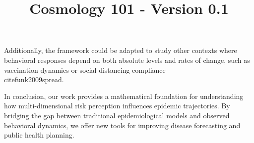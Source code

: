 \documentclass{article}\usepackage{graphicx} \usepackage{amsmath} \usepackage{colortbl}\title{Cosmology 101 - Version 0.1}
\begin{document}
Additionally, the framework could be adapted to study other contexts where behavioral responses depend on both absolute levels and rates of change, such as vaccination dynamics or social distancing compliance \\cite{funk2009spread}.

In conclusion, our work provides a mathematical foundation for understanding how multi-dimensional risk perception influences epidemic trajectories. By bridging the gap between traditional epidemiological models and observed behavioral dynamics, we offer new tools for improving disease forecasting and public health planning.
\end{document}
